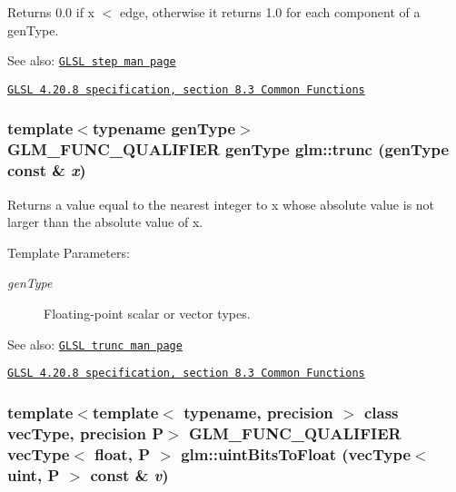Returns 0.0 if x $<$ edge, otherwise it returns 1.0 for each component of a genType.

\begin{Desc}
\item[See also:]\href{http://www.opengl.org/sdk/docs/manglsl/xhtml/step.xml}{\tt GLSL step man page} 

\href{http://www.opengl.org/registry/doc/GLSLangSpec.4.20.8.pdf}{\tt GLSL 4.20.8 specification, section 8.3 Common Functions} \end{Desc}
\hypertarget{group__core__func__common_g30f4c901cd3ebdd26e8f0a73f15c1e89}{
\subsubsection[trunc]{\setlength{\rightskip}{0pt plus 5cm}template$<$typename genType$>$ GLM\_\-FUNC\_\-QUALIFIER genType glm::trunc (genType const \& {\em x})}}
\label{group__core__func__common_g30f4c901cd3ebdd26e8f0a73f15c1e89}


Returns a value equal to the nearest integer to x whose absolute value is not larger than the absolute value of x.

\begin{Desc}
\item[Template Parameters:]
\begin{description}
\item[{\em genType}]Floating-point scalar or vector types.\end{description}
\end{Desc}
\begin{Desc}
\item[See also:]\href{http://www.opengl.org/sdk/docs/manglsl/xhtml/trunc.xml}{\tt GLSL trunc man page} 

\href{http://www.opengl.org/registry/doc/GLSLangSpec.4.20.8.pdf}{\tt GLSL 4.20.8 specification, section 8.3 Common Functions} \end{Desc}
\hypertarget{group__core__func__common_gda31018f0dedd22004850229eb178b0d}{
\subsubsection[uintBitsToFloat]{\setlength{\rightskip}{0pt plus 5cm}template$<$template$<$ typename, precision $>$ class vecType, precision P$>$ GLM\_\-FUNC\_\-QUALIFIER vecType$<$ float, P $>$ glm::uintBitsToFloat (vecType$<$ uint, P $>$ const \& {\em v})}}
\label{group__core__func__common_gda31018f0dedd22004850229eb178b0d}


